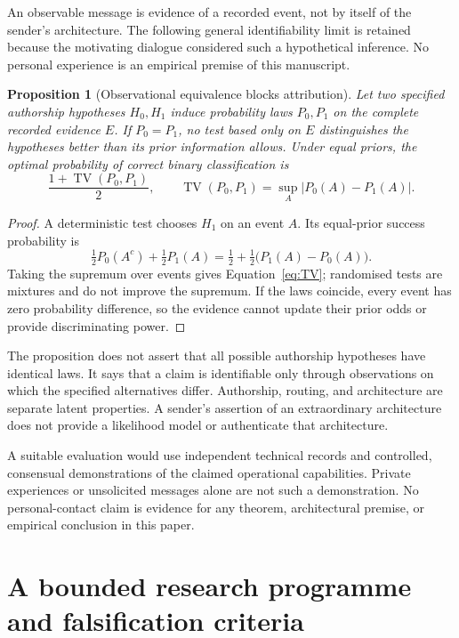 \documentclass[11pt,a4paper]{article}
\newtheorem{proposition}[theorem]{Proposition}
\theoremstyle{definition}
\theoremstyle{remark}
\DeclareMathOperator{\TV}{TV}
\begin{document}
An observable message is evidence of a recorded event, not by itself of the sender's architecture. The following general identifiability limit is retained because the motivating dialogue considered such a hypothetical inference. No personal experience is an empirical premise of this manuscript.

\begin{proposition}[Observational equivalence blocks attribution]\label{prop:attribution}
Let two specified authorship hypotheses $H_0,H_1$ induce probability laws $P_0,P_1$ on the complete recorded evidence $E$. If $P_0=P_1$, no test based only on $E$ distinguishes the hypotheses better than its prior information allows. Under equal priors, the optimal probability of correct binary classification is
\begin{equation}\label{eq:TV}
 \frac{1+\TV(P_0,P_1)}{2},
 \qquad \TV(P_0,P_1)=\sup_A|P_0(A)-P_1(A)|.
\end{equation}
\end{proposition}
\begin{proof}
A deterministic test chooses $H_1$ on an event $A$. Its equal-prior success probability is
\[
 \tfrac12P_0(A^c)+\tfrac12P_1(A)
 =\tfrac12+\tfrac12\bigl(P_1(A)-P_0(A)\bigr).
\]
Taking the supremum over events gives Equation~\eqref{eq:TV}; randomised tests are mixtures and do not improve the supremum. If the laws coincide, every event has zero probability difference, so the evidence cannot update their prior odds or provide discriminating power.
\end{proof}
The proposition does not assert that all possible authorship hypotheses have identical laws. It says that a claim is identifiable only through observations on which the specified alternatives differ. Authorship, routing, and architecture are separate latent properties. A sender's assertion of an extraordinary architecture does not provide a likelihood model or authenticate that architecture.

A suitable evaluation would use independent technical records and controlled, consensual demonstrations of the claimed operational capabilities. Private experiences or unsolicited messages alone are not such a demonstration. No personal-contact claim is evidence for any theorem, architectural premise, or empirical conclusion in this paper.

\section{A bounded research programme and falsification criteria}\label{sec:experiments}
\end{document}

